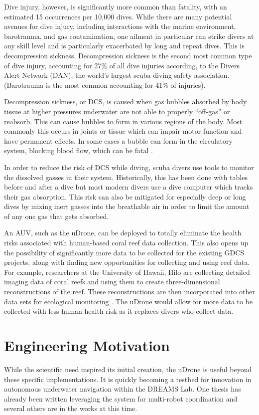 Dive injury, however, is significantly more common than fatality, with an estimated 15 occurrences per 10,000 dives. While there are many potential avenues for dive injury, including interactions with the marine environment, barotrauma, and gas contamination, one ailment in particular can strike divers at any skill level and is particularly exacerbated by long and repeat dives. This is decompression sickness. Decompression sickness is the second most common type of dive injury, accounting for 27\% of all dive injuries according, to the Divers Alert Network (DAN), the world's largest scuba diving safety association. (Barotrauma is the most common accounting for 41\% of injuries). 

Decompression sickness, or DCS, is caused when gas bubbles absorbed by body tissue at higher pressures underwater are not able to properly “off-gas” or reabsorb. This can cause bubbles to form in various regions of the body. Most commonly this occurs in joints or tissue which can impair motor function and have permanent effects. In some cases a bubble can form in the circulatory system, blocking blood flow, which can be fatal \parencite{dcs}.

In order to reduce the risk of DCS while diving, scuba divers use tools to monitor the dissolved gasses in their system. Historically, this has been done with tables before and after a dive but most modern divers use a dive computer which tracks their gas absorption. This risk can also be mitigated for especially deep or long dives by mixing inert gasses into the breathable air in order to limit the amount of any one gas that gets absorbed.

An AUV, such as the uDrone, can be deployed to totally eliminate the health risks associated with human-based coral reef data collection. This also opens up the possibility of significantly more data to be collected for the existing GDCS projects, along with finding new opportunities for collecting and using reef data. For example, researchers at the University of Hawaii, Hilo are collecting detailed imaging data of coral reefs and using them to create three-dimensional reconstructions of the reef. These reconstructions are then incorporated into other data sets for ecological monitoring \parencite{burns}. The uDrone would allow for more data to be collected with less human health risk as it replaces divers who collect data. 

\section{Engineering Motivation}
While the scientific need inspired its initial creation, the uDrone is useful beyond these specific implementations. It is quickly becoming a testbed for innovation in autonomous underwater navigation within the DREAMS Lab. One thesis has already been written leveraging the system for multi-robot coordination and several others are in the works at this time.

